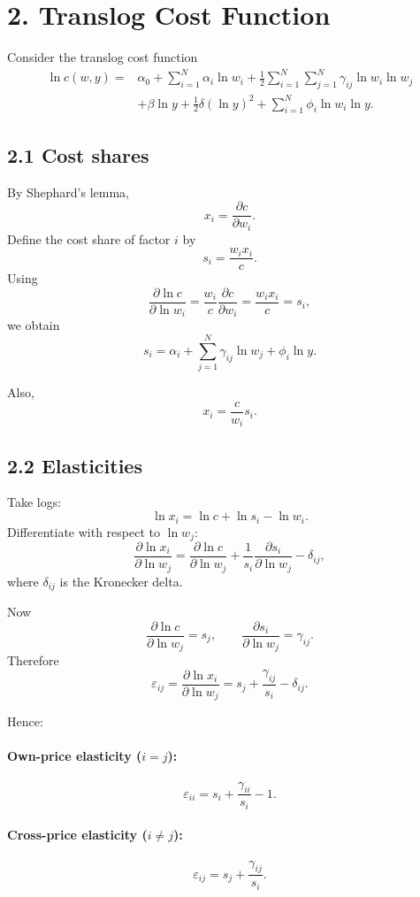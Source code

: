 \bigskip
\section*{2. Translog Cost Function}

Consider the translog cost function
\[
\begin{aligned}
\ln c(w,y)
=
&\alpha_0
+
\sum_{i=1}^N \alpha_i \ln w_i
+
\frac{1}{2}\sum_{i=1}^N\sum_{j=1}^N \gamma_{ij}\ln w_i \ln w_j\\
&+
\beta \ln y
+
\frac{1}{2}\delta (\ln y)^2
+
\sum_{i=1}^N \phi_i \ln w_i \ln y.
\end{aligned}
\]

\subsection*{2.1 Cost shares}

By Shephard's lemma,
\[
x_i=\frac{\partial c}{\partial w_i}.
\]
Define the cost share of factor \(i\) by
\[
s_i=\frac{w_i x_i}{c}.
\]
Using
\[
\frac{\partial \ln c}{\partial \ln w_i}
=
\frac{w_i}{c}\frac{\partial c}{\partial w_i}
=
\frac{w_i x_i}{c}
=
s_i,
\]
we obtain
\[
\boxed{
s_i
=
\alpha_i+\sum_{j=1}^N \gamma_{ij}\ln w_j+\phi_i \ln y.
}
\]

Also,
\[
x_i=\frac{c}{w_i}s_i.
\]

\subsection*{2.2 Elasticities}

Take logs:
\[
\ln x_i=\ln c+\ln s_i-\ln w_i.
\]
Differentiate with respect to \(\ln w_j\):
\[
\frac{\partial \ln x_i}{\partial \ln w_j}
=
\frac{\partial \ln c}{\partial \ln w_j}
+
\frac{1}{s_i}\frac{\partial s_i}{\partial \ln w_j}
-
\delta_{ij},
\]
where \(\delta_{ij}\) is the Kronecker delta.

Now
\[
\frac{\partial \ln c}{\partial \ln w_j}=s_j,
\qquad
\frac{\partial s_i}{\partial \ln w_j}=\gamma_{ij}.
\]
Therefore
\[
\boxed{
\varepsilon_{ij}
=
\frac{\partial \ln x_i}{\partial \ln w_j}
=
s_j+\frac{\gamma_{ij}}{s_i}-\delta_{ij}.
}
\]

Hence:

\paragraph{Own-price elasticity (\(i=j\)):}
\[
\boxed{
\varepsilon_{ii}
=
s_i+\frac{\gamma_{ii}}{s_i}-1.
}
\]

\paragraph{Cross-price elasticity (\(i\neq j\)):}
\[
\boxed{
\varepsilon_{ij}
=
s_j+\frac{\gamma_{ij}}{s_i}.
}
\]


